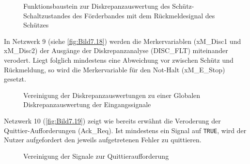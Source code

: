 \begin{figure}[H]
   \centering
   \caption[Diskrepanzauswertung Schütz Förderband]{Funktionsbaustein zur Diskrepanzauswertung des Schütz-Schaltzustandes des Förderbandes mit dem Rückmeldesignal des Schützes}
   \label{fig:Bild7.17}
\end{figure}

In Netzwerk 9 (siehe \autoref{fig:Bild7.18}) werden die Merkervariablen (xM\_Disc1 und xM\_Disc2) der Ausgänge der Diskrepanzanalyse (DISC\_FLT) miteinander verodert. Liegt folglich mindestens eine Abweichung vor zwischen Schütz und Rückmeldung, so wird die Merkervariable für den Not-Halt (xM\_E\_Stop) gesetzt.

\begin{figure}[H]
   \centering
   \caption[Globale Diskrepanzauswertung]{Vereinigung der Diskrepanzauswertungen zu einer Globalen Diskrepanzauswertung der Eingangssignale}
   \label{fig:Bild7.18}
\end{figure}

Netzwerk 10 (\autoref{fig:Bild7.19}) zeigt wie bereits erwähnt die Veroderung der Quittier-Aufforderungen (Ack\_Req). Ist mindestens ein Signal auf \texttt{TRUE}, wird der Nutzer aufgefordert den jeweils aufgetretenen Fehler zu quittieren.

\begin{figure}[H]
   \centering
   \caption[Vereinigung Quittieraufforderungen]{Vereinigung der Signale zur Quittieraufforderung}
   \label{fig:Bild7.19}
\end{figure}

